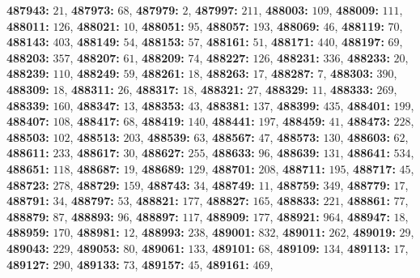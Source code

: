 \textsf{\bfseries 487943:} $21$, \textsf{\bfseries 487973:} $68$, \textsf{\bfseries 487979:} $2$, \textsf{\bfseries 487997:} $211$, \textsf{\bfseries 488003:} $109$, \textsf{\bfseries 488009:} $111$, \textsf{\bfseries 488011:} $126$, \textsf{\bfseries 488021:} $10$, \textsf{\bfseries 488051:} $95$, \textsf{\bfseries 488057:} $193$, \textsf{\bfseries 488069:} $46$, \textsf{\bfseries 488119:} $70$, \textsf{\bfseries 488143:} $403$, \textsf{\bfseries 488149:} $54$, \textsf{\bfseries 488153:} $57$, \textsf{\bfseries 488161:} $51$, \textsf{\bfseries 488171:} $440$, \textsf{\bfseries 488197:} $69$, \textsf{\bfseries 488203:} $357$, \textsf{\bfseries 488207:} $61$, \textsf{\bfseries 488209:} $74$, \textsf{\bfseries 488227:} $126$, \textsf{\bfseries 488231:} $336$, \textsf{\bfseries 488233:} $20$, \textsf{\bfseries 488239:} $110$, \textsf{\bfseries 488249:} $59$, \textsf{\bfseries 488261:} $18$, \textsf{\bfseries 488263:} $17$, \textsf{\bfseries 488287:} $7$, \textsf{\bfseries 488303:} $390$, \textsf{\bfseries 488309:} $18$, \textsf{\bfseries 488311:} $26$, \textsf{\bfseries 488317:} $18$, \textsf{\bfseries 488321:} $27$, \textsf{\bfseries 488329:} $11$, \textsf{\bfseries 488333:} $269$, \textsf{\bfseries 488339:} $160$, \textsf{\bfseries 488347:} $13$, \textsf{\bfseries 488353:} $43$, \textsf{\bfseries 488381:} $137$, \textsf{\bfseries 488399:} $435$, \textsf{\bfseries 488401:} $199$, \textsf{\bfseries 488407:} $108$, \textsf{\bfseries 488417:} $68$, \textsf{\bfseries 488419:} $140$, \textsf{\bfseries 488441:} $197$, \textsf{\bfseries 488459:} $41$, \textsf{\bfseries 488473:} $228$, \textsf{\bfseries 488503:} $102$, \textsf{\bfseries 488513:} $203$, \textsf{\bfseries 488539:} $63$, \textsf{\bfseries 488567:} $47$, \textsf{\bfseries 488573:} $130$, \textsf{\bfseries 488603:} $62$, \textsf{\bfseries 488611:} $233$, \textsf{\bfseries 488617:} $30$, \textsf{\bfseries 488627:} $255$, \textsf{\bfseries 488633:} $96$, \textsf{\bfseries 488639:} $131$, \textsf{\bfseries 488641:} $534$, \textsf{\bfseries 488651:} $118$, \textsf{\bfseries 488687:} $19$, \textsf{\bfseries 488689:} $129$, \textsf{\bfseries 488701:} $208$, \textsf{\bfseries 488711:} $195$, \textsf{\bfseries 488717:} $45$, \textsf{\bfseries 488723:} $278$, \textsf{\bfseries 488729:} $159$, \textsf{\bfseries 488743:} $34$, \textsf{\bfseries 488749:} $11$, \textsf{\bfseries 488759:} $349$, \textsf{\bfseries 488779:} $17$, \textsf{\bfseries 488791:} $34$, \textsf{\bfseries 488797:} $53$, \textsf{\bfseries 488821:} $177$, \textsf{\bfseries 488827:} $165$, \textsf{\bfseries 488833:} $221$, \textsf{\bfseries 488861:} $77$, \textsf{\bfseries 488879:} $87$, \textsf{\bfseries 488893:} $96$, \textsf{\bfseries 488897:} $117$, \textsf{\bfseries 488909:} $177$, \textsf{\bfseries 488921:} $964$, \textsf{\bfseries 488947:} $18$, \textsf{\bfseries 488959:} $170$, \textsf{\bfseries 488981:} $12$, \textsf{\bfseries 488993:} $238$, \textsf{\bfseries 489001:} $832$, \textsf{\bfseries 489011:} $262$, \textsf{\bfseries 489019:} $29$, \textsf{\bfseries 489043:} $229$, \textsf{\bfseries 489053:} $80$, \textsf{\bfseries 489061:} $133$, \textsf{\bfseries 489101:} $68$, \textsf{\bfseries 489109:} $134$, \textsf{\bfseries 489113:} $17$, \textsf{\bfseries 489127:} $290$, \textsf{\bfseries 489133:} $73$, \textsf{\bfseries 489157:} $45$, \textsf{\bfseries 489161:} $469$, 
